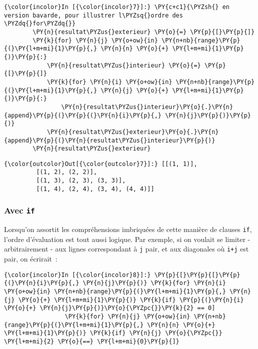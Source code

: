     \begin{Verbatim}[commandchars=\\\{\}]
{\color{incolor}In [{\color{incolor}7}]:} \PY{c+c1}{\PYZsh{} en version bavarde, pour illustrer l\PYZsq{}ordre des \PYZdq{}for\PYZdq{}}
        \PY{n}{resultat\PYZus{}exterieur} \PY{o}{=} \PY{p}{[}\PY{p}{]}
        \PY{k}{for} \PY{n}{j} \PY{o+ow}{in} \PY{n+nb}{range}\PY{p}{(}\PY{l+m+mi}{1}\PY{p}{,} \PY{n}{n} \PY{o}{+} \PY{l+m+mi}{1}\PY{p}{)}\PY{p}{:}
            \PY{n}{resultat\PYZus{}interieur} \PY{o}{=} \PY{p}{[}\PY{p}{]}
            \PY{k}{for} \PY{n}{i} \PY{o+ow}{in} \PY{n+nb}{range}\PY{p}{(}\PY{l+m+mi}{1}\PY{p}{,} \PY{n}{j} \PY{o}{+} \PY{l+m+mi}{1}\PY{p}{)}\PY{p}{:}
                \PY{n}{resultat\PYZus{}interieur}\PY{o}{.}\PY{n}{append}\PY{p}{(}\PY{p}{(}\PY{n}{i}\PY{p}{,} \PY{n}{j}\PY{p}{)}\PY{p}{)}
            \PY{n}{resultat\PYZus{}exterieur}\PY{o}{.}\PY{n}{append}\PY{p}{(}\PY{n}{resultat\PYZus{}interieur}\PY{p}{)}
        \PY{n}{resultat\PYZus{}exterieur}
\end{Verbatim}


\begin{Verbatim}[commandchars=\\\{\}]
{\color{outcolor}Out[{\color{outcolor}7}]:} [[(1, 1)],
         [(1, 2), (2, 2)],
         [(1, 3), (2, 3), (3, 3)],
         [(1, 4), (2, 4), (3, 4), (4, 4)]]
\end{Verbatim}
            
    \hypertarget{avec-if}{%
\subsubsection{\texorpdfstring{Avec
\texttt{if}}{Avec if}}\label{avec-if}}

    Lorsqu'on assortit les compréhensions imbriquées de cette manière de
clauses \texttt{if}, l'ordre d'évaluation est tout aussi logique. Par
exemple, si on voulait se limiter - arbitrairement - aux lignes
correspondant à \texttt{j} pair, et aux diagonales où \texttt{i+j} est
pair, on écrirait~:

    \begin{Verbatim}[commandchars=\\\{\}]
{\color{incolor}In [{\color{incolor}8}]:} \PY{p}{[}\PY{p}{[}\PY{p}{(}\PY{n}{i}\PY{p}{,} \PY{n}{j}\PY{p}{)} \PY{k}{for} \PY{n}{i} \PY{o+ow}{in} \PY{n+nb}{range}\PY{p}{(}\PY{l+m+mi}{1}\PY{p}{,} \PY{n}{j} \PY{o}{+} \PY{l+m+mi}{1}\PY{p}{)} \PY{k}{if} \PY{p}{(}\PY{n}{i} \PY{o}{+} \PY{n}{j}\PY{p}{)}\PY{o}{\PYZpc{}}\PY{k}{2} == 0]
                 \PY{k}{for} \PY{n}{j} \PY{o+ow}{in} \PY{n+nb}{range}\PY{p}{(}\PY{l+m+mi}{1}\PY{p}{,} \PY{n}{n} \PY{o}{+} \PY{l+m+mi}{1}\PY{p}{)} \PY{k}{if} \PY{n}{j} \PY{o}{\PYZpc{}} \PY{l+m+mi}{2} \PY{o}{==} \PY{l+m+mi}{0}\PY{p}{]}
\end{Verbatim}


